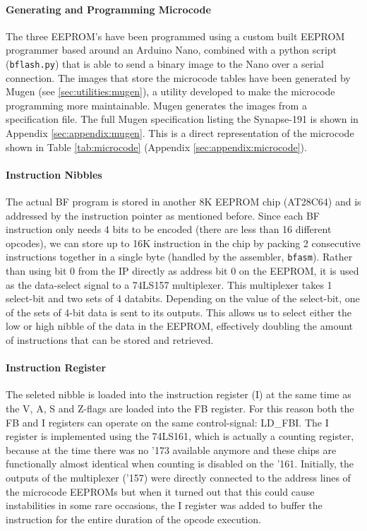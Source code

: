 \paragraph{Generating and Programming Microcode} The three EEPROM's have been programmed using a custom built EEPROM programmer based around an Arduino Nano, combined with a python script (\texttt{bflash.py}) that is able to send a binary image to the Nano over a serial connection. The images that store the microcode tables have been generated by Mugen (see \ref{sec:utilities:mugen}), a utility developed to make the microcode programming more maintainable. Mugen generates the images from a specification file. The full Mugen specification listing the Synapse-191 is shown in Appendix \ref{sec:appendix:mugen}. This is a direct representation of the microcode shown in Table \ref{tab:microcode} (Appendix \ref{sec:appendix:microcode}).



\paragraph{Instruction Nibbles} The actual BF program is stored in another 8K EEPROM chip (AT28C64) and is addressed by the instruction pointer as mentioned before. Since each BF instruction only needs 4 bits to be encoded (there are less than 16 different opcodes), we can store up to 16K instruction in the chip by packing 2 consecutive instructions together in a single byte (handled by the assembler, \texttt{bfasm}). Rather than using bit 0 from the IP directly as address bit 0 on the EEPROM, it is used as the data-select signal to a 74LS157 multiplexer. This multiplexer takes 1 select-bit and two sets of 4 databits. Depending on the value of the select-bit, one of the sets of 4-bit data is sent to its outputs. This allows us to select either the low or high nibble of the data in the EEPROM, effectively doubling the amount of instructions that can be stored and retrieved.

\paragraph{Instruction Register} The seleted nibble is loaded into the instruction register (I) at the same time as the V, A, S and Z-flags are loaded into the FB register. For this reason both the FB and I registers can operate on the same control-signal: LD\_FBI. The I register is implemented using the 74LS161, which is actually a counting register, because at the time there was no '173 available anymore and these chips are functionally almost identical when counting is disabled on the '161. Initially, the outputs of the multiplexer ('157) were directly connected to the address lines of the microcode EEPROMs but when it turned out that this could cause instabilities in some rare occasions, the I register was added to buffer the instruction for the entire duration of the opcode execution.
 
